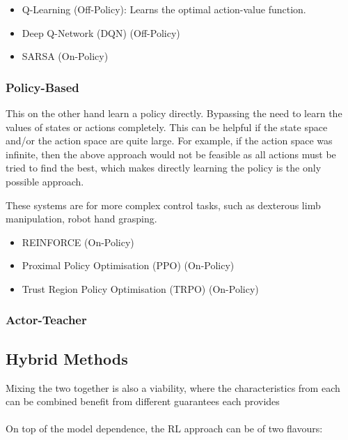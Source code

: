     \begin{itemize}
      \item Q-Learning (Off-Policy): Learns the optimal action-value function.
      \item Deep Q-Network (DQN) (Off-Policy)
      \item SARSA (On-Policy)
    \end{itemize}

  \subsubsection{Policy-Based}
  This on the other hand learn a policy directly. Bypassing the need to learn the values of states or actions completely. This can be helpful if the state space and/or the action space are quite large. For example, if the action space was infinite, then the above approach would not be feasible as all actions must be tried to find the best, which makes directly learning the policy is the only possible approach.

  These systems are for more complex control tasks, such as dexterous limb manipulation, robot hand grasping.

    \begin{itemize}
      \item REINFORCE (On-Policy)
      \item Proximal Policy Optimisation (PPO) (On-Policy)
      \item Trust Region Policy Optimisation (TRPO) (On-Policy)
    \end{itemize}

  \subsubsection{Actor-Teacher} 
  
  \subsection{Hybrid Methods}
  Mixing the two together is also a viability, where the characteristics from each can be combined benefit from different guarantees each provides \cite{qu2020combiningmodelbasedmodelfreemethods}
\\\\
  On top of the model dependence, the RL approach can be of two flavours:

